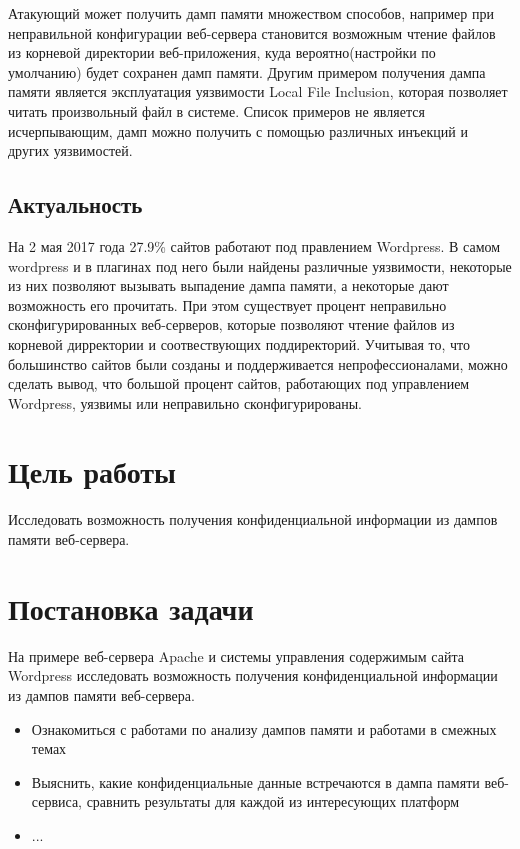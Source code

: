\documentclass[20pt]{article}
\begin{document}
Атакующий может получить дамп памяти множеством способов, например при
неправильной конфигурации веб-сервера становится возможным чтение файлов из
корневой директории веб-приложения, куда вероятно(настройки по умолчанию)
будет сохранен дамп памяти. Другим примером получения дампа памяти является
эксплуатация уязвимости Local File Inclusion, которая позволяет читать
произвольный файл в системе. Список примеров не является исчерпывающим, дамп
можно получить с помощью различных инъекций и других уязвимостей.

\subsection{Актуальность}
На 2 мая 2017 года 27.9\% сайтов работают под правлением Wordpress.
\cite{number_of_wordpress_sites} В самом wordpress и в плагинах под него были
найдены различные уязвимости, некоторые из них позволяют вызывать выпадение
дампа памяти, а некоторые дают возможность его прочитать. При этом существует
процент неправильно сконфигурированных веб-серверов, которые позволяют чтение
файлов из корневой дирректории и соотвествующих поддиректорий. Учитывая то,
что большинство сайтов были созданы и поддерживается непрофессионалами, можно
сделать вывод, что большой процент сайтов, работающих под управлением Wordpress,
уязвимы или неправильно сконфигурированы.

\newpage

\section{Цель работы}
Исследовать возможность получения конфиденциальной информации из дампов памяти веб-сервера.

\newpage

\section{Постановка задачи}
На примере веб-сервера Apache и системы управления содержимым сайта Wordpress
исследовать возможность получения конфиденциальной информации из дампов памяти
веб-сервера.

\begin{itemize}
  \item Ознакомиться с работами по анализу дампов памяти и работами в смежных темах
  \item Выяснить, какие конфиденциальные данные встречаются в дампа памяти веб-сервиса,
сравнить результаты для каждой из интересующих платформ
  \item ...
\end{itemize}
\end{document}
